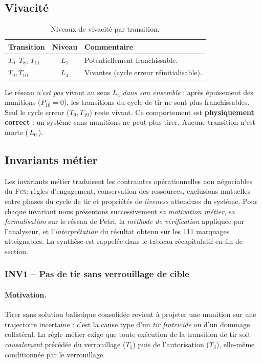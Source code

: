 \documentclass[11pt,a4paper]{article}
\newcommand{\fcs}{\textsc{Fcs}\xspace}
\begin{document}
\subsection{Vivacité}

\begin{table}[H]
\centering\small
\begin{tabular}{l c l}
\toprule
\rowcolor{tableheader}\textbf{Transition} & \textbf{Niveau} & \textbf{Commentaire} \\
\midrule
$T_0$--$T_8$, $T_{11}$  & $L_1$ & Potentiellement franchissable. \\
$T_9, T_{10}$           & $L_4$ & Vivantes (cycle erreur réinitialisable). \\
\bottomrule
\end{tabular}
\caption{Niveaux de vivacité par transition.}
\end{table}

\noindent
Le réseau \emph{n'est pas} vivant au sens $L_4$ \emph{dans son ensemble} :
après épuisement des munitions ($P_{10}=0$), les transitions du cycle de tir
ne sont plus franchissables. Seul le cycle erreur ($T_9, T_{10}$) reste
vivant. Ce comportement est \textbf{physiquement correct} : un système sans
munitions ne peut plus tirer. Aucune transition n'est morte (\,$L_0$\,).

\subsection{Invariants métier}

Les invariants métier traduisent les contraintes opérationnelles non
négociables du \fcs : règles d'engagement, conservation des ressources,
exclusions mutuelles entre phases du cycle de tir et propriétés de
\emph{liveness} attendues du système. Pour chaque invariant nous présentons
successivement sa \emph{motivation métier}, sa \emph{formalisation} sur le
réseau de Petri, la \emph{méthode de vérification} appliquée par
l'analyseur, et l'\emph{interprétation} du résultat obtenu sur les 111
marquages atteignables. La synthèse est rappelée dans le tableau
récapitulatif en fin de section.

\subsubsection*{INV1 -- Pas de tir sans verrouillage de cible}

\paragraph{Motivation.}
Tirer sans solution balistique consolidée revient à projeter une munition
sur une trajectoire incertaine : c'est la cause type d'un \emph{tir fratricide}
ou d'un dommage collatéral. La règle métier exige que toute exécution
de la transition de tir soit \emph{causalement} précédée du verrouillage
($T_1$) puis de l'autorisation ($T_3$), elle-même conditionnée par le
verrouillage.
\end{document}
